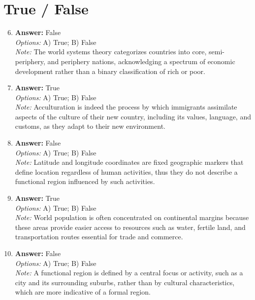 \documentclass[12pt]{article}
\begin{document}
\section*{True / False}
\begin{enumerate}[label=\arabic*.]
\setcounter{enumi}{5}
\item \textbf{Answer:} False
\\ \textit{Options:} A) True; B) False
\\ \textit{Note:} The world systems theory categorizes countries into core, semi-periphery, and periphery nations, acknowledging a spectrum of economic development rather than a binary classification of rich or poor.
\item \textbf{Answer:} True
\\ \textit{Options:} A) True; B) False
\\ \textit{Note:} Acculturation is indeed the process by which immigrants assimilate aspects of the culture of their new country, including its values, language, and customs, as they adapt to their new environment.
\item \textbf{Answer:} False
\\ \textit{Options:} A) True; B) False
\\ \textit{Note:} Latitude and longitude coordinates are fixed geographic markers that define location regardless of human activities, thus they do not describe a functional region influenced by such activities.
\item \textbf{Answer:} True
\\ \textit{Options:} A) True; B) False
\\ \textit{Note:} World population is often concentrated on continental margins because these areas provide easier access to resources such as water, fertile land, and transportation routes essential for trade and commerce.
\item \textbf{Answer:} False
\\ \textit{Options:} A) True; B) False
\\ \textit{Note:} A functional region is defined by a central focus or activity, such as a city and its surrounding suburbs, rather than by cultural characteristics, which are more indicative of a formal region.
\end{enumerate}
\end{document}
